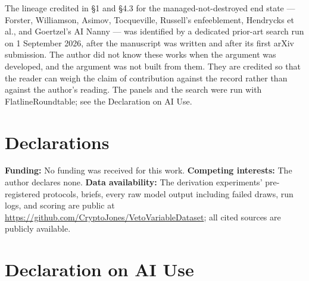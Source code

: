 \documentclass[11pt]{article}
\theoremstyle{definition}
\begin{document}
The lineage credited in \S1 and \S4.3 for the managed-not-destroyed end state --- Forster, Williamson, Asimov, Tocqueville, Russell's enfeeblement, Hendrycks et al., and Goertzel's AI Nanny --- was identified by a dedicated prior-art search run on 1 September 2026, after the manuscript was written and after its first arXiv submission. The author did not know these works when the argument was developed, and the argument was not built from them. They are credited so that the reader can weigh the claim of contribution against the record rather than against the author's reading. The panels and the search were run with FlatlineRoundtable; see the Declaration on AI Use.

\section*{Declarations}

\noindent\textbf{Funding:} No funding was received for this work. \quad \textbf{Competing interests:} The author declares none. \quad \textbf{Data availability:} The derivation experiments' pre-registered protocols, briefs, every raw model output including failed draws, run logs, and scoring are public at \url{https://github.com/CryptoJones/VetoVariableDataset}; all cited sources are publicly available.

\section*{Declaration on AI Use}
\end{document}
